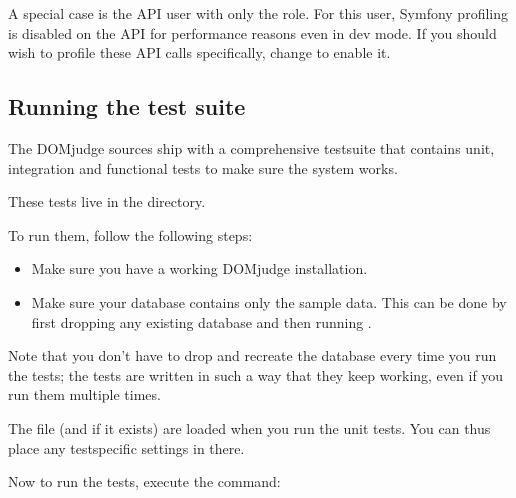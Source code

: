 \documentclass[a4paper,10pt,english,openany]{sphinxmanual}
\begin{document}
\sphinxAtStartPar
A special case is the API user with only the  role. For
this user, Symfony profiling is disabled on the API for performance
reasons even in dev mode. If you should wish to profile these API calls
specifically, change 
to enable it.


\subsection{Running the test suite}
\label{\detokenize{develop:running-the-test-suite}}
\sphinxAtStartPar
The DOMjudge sources ship with a comprehensive test\sphinxhyphen{}suite that contains
unit, integration and functional tests to make sure the system works.

\sphinxAtStartPar
These tests live in the  directory.

\sphinxAtStartPar
To run them, follow the following steps:
\begin{itemize}
\item {} 
\sphinxAtStartPar
Make sure you have a working DOMjudge installation.

\item {} 
\sphinxAtStartPar
Make sure your database contains only the sample data. This can be done by
first dropping any existing database and then running
.

\end{itemize}

\sphinxAtStartPar
Note that you don’t have to drop and recreate the database every time you run the
tests; the tests are written in such a way that they keep working, even if you
run them multiple times.

\sphinxAtStartPar
The file  (and  if it
exists) are loaded when you run the unit tests. You can thus place any
test\sphinxhyphen{}specific settings in there.

\sphinxAtStartPar
Now to run the tests, execute the command:

\begin{sphinxVerbatim}[commandchars=\\\{\}]
  
\end{sphinxVerbatim}
\end{document}
